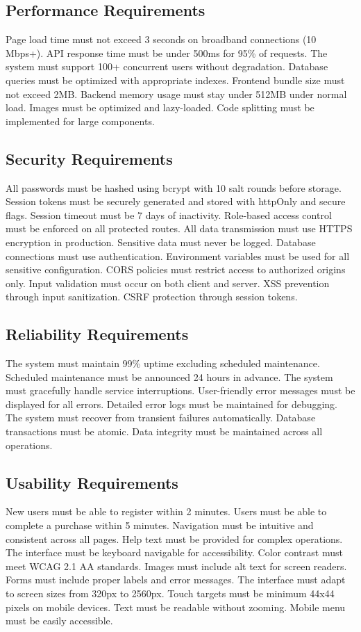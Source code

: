 ﻿\documentclass[11pt]{article}
\begin{document}
\subsection{Performance Requirements}
Page load time must not exceed 3 seconds on broadband connections (10 Mbps+). API response time must be under 500ms for 95\% of requests. The system must support 100+ concurrent users without degradation. Database queries must be optimized with appropriate indexes. Frontend bundle size must not exceed 2MB. Backend memory usage must stay under 512MB under normal load. Images must be optimized and lazy-loaded. Code splitting must be implemented for large components.

\subsection{Security Requirements}
All passwords must be hashed using bcrypt with 10 salt rounds before storage. Session tokens must be securely generated and stored with httpOnly and secure flags. Session timeout must be 7 days of inactivity. Role-based access control must be enforced on all protected routes. All data transmission must use HTTPS encryption in production. Sensitive data must never be logged. Database connections must use authentication. Environment variables must be used for all sensitive configuration. CORS policies must restrict access to authorized origins only. Input validation must occur on both client and server. XSS prevention through input sanitization. CSRF protection through session tokens.

\subsection{Reliability Requirements}
The system must maintain 99\% uptime excluding scheduled maintenance. Scheduled maintenance must be announced 24 hours in advance. The system must gracefully handle service interruptions. User-friendly error messages must be displayed for all errors. Detailed error logs must be maintained for debugging. The system must recover from transient failures automatically. Database transactions must be atomic. Data integrity must be maintained across all operations.

\subsection{Usability Requirements}
New users must be able to register within 2 minutes. Users must be able to complete a purchase within 5 minutes. Navigation must be intuitive and consistent across all pages. Help text must be provided for complex operations. The interface must be keyboard navigable for accessibility. Color contrast must meet WCAG 2.1 AA standards. Images must include alt text for screen readers. Forms must include proper labels and error messages. The interface must adapt to screen sizes from 320px to 2560px. Touch targets must be minimum 44x44 pixels on mobile devices. Text must be readable without zooming. Mobile menu must be easily accessible.
\end{document}
